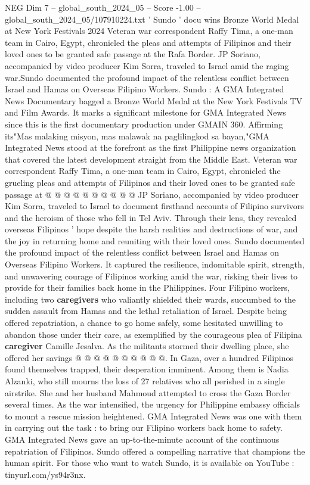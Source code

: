\begin{textsample}{NEG Dim 7 – global\_south\_2024\_05 – Score -1.00 – global\_south\_2024\_05/107910224.txt}  \label{ex:f7_neg_242}
' Sundo ' docu wins Bronze World Medal at New York Festivals 2024 Veteran war correspondent Raffy Tima, a one-man team in Cairo, Egypt, chronicled the pleas and attempts of Filipinos and their loved ones to be granted safe passage at the Rafa Border.
JP Soriano, accompanied by video producer Kim Sorra, traveled to Israel amid the raging war.Sundo documented the profound impact of the relentless conflict between Israel and Hamas on Overseas Filipino Workers.
Sundo : A GMA Integrated News Documentary bagged a Bronze World Medal at the New York Festivals TV and Film Awards.
It marks a significant milestone for GMA Integrated News since this is the first documentary production under GMAIN 360.
Affirming its"Mas malaking misyon, mas malawak na paglilingkod sa bayan,"GMA Integrated News stood at the forefront as the first Philippine news organization that covered the latest development straight from the Middle East.
Veteran war correspondent Raffy Tima, a one-man team in Cairo, Egypt, chronicled the grueling pleas and attempts of Filipinos and their loved ones to be granted safe passage at @ @ @ @ @ @ @ @ @ @ JP Soriano, accompanied by video producer Kim Sorra, traveled to Israel to document firsthand accounts of Filipino survivors and the heroism of those who fell in Tel Aviv.
Through their lens, they revealed overseas Filipinos ' hope despite the harsh realities and destructions of war, and the joy in returning home and reuniting with their loved ones.
Sundo documented the profound impact of the relentless conflict between Israel and Hamas on Overseas Filipino Workers.
It captured the resilience, indomitable spirit, strength, and unwavering courage of Filipinos working amid the war, risking their lives to provide for their families back home in the Philippines.
Four Filipino workers, including two \textbf{caregivers} who valiantly shielded their wards, succumbed to the sudden assault from Hamas and the lethal retaliation of Israel.
Despite being offered repatriation, a chance to go home safely, some hesitated unwilling to abandon those under their care, as exemplified by the courageous plea of Filipina \textbf{caregiver} Camille Jesalva.
As the militants stormed their dwelling place, she offered her savings @ @ @ @ @ @ @ @ @ @.
In Gaza, over a hundred Filipinos found themselves trapped, their desperation imminent.
Among them is Nadia Alzanki, who still mourns the loss of 27 relatives who all perished in a single airstrike.
She and her husband Mahmoud attempted to cross the Gaza Border several times.
As the war intensified, the urgency for Philippine embassy officials to mount a rescue mission heightened.
GMA Integrated News was one with them in carrying out the task : to bring our Filipino workers back home to safety.
GMA Integrated News gave an up-to-the-minute account of the continuous repatriation of Filipinos.
Sundo offered a compelling narrative that champions the human spirit.
For those who want to watch Sundo, it is available on YouTube : tinyurl.com/ys94r3nx.

\end{textsample}
